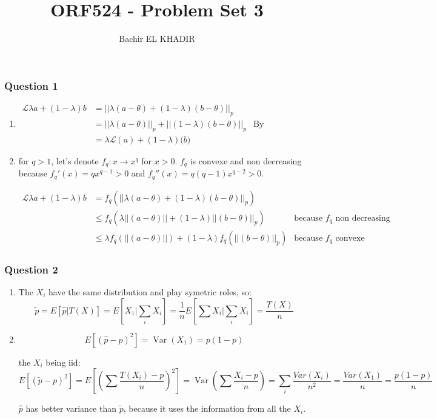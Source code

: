\documentclass[12pt]{article}
\title{ORF524 - Problem Set 3}
\author{Bachir EL KHADIR }
\newcommand{\Q}[1]{\subsubsection*{Question #1}}
\begin{document}
\maketitle

\Q{1}
\begin{enumerate}

\item

\begin{align}
\mathcal L \lambda a + (1-\lambda)b 
&= ||\lambda (a-\theta) + (1-\lambda)(b-\theta) ||_p
\\&= ||\lambda (a-\theta)||_p + ||(1-\lambda)(b-\theta) ||_p &\text{By Minkowsky}
\\&= \lambda \mathcal L(a) + (1-\lambda) \mathcal(b)
\end{align}


\item 
for $q > 1$, let's denote $f_q: x \rightarrow x^q$ for $x > 0$.
$f_q$ is convexe and non decreasing because $f_q'(x) = q x^{q-1} > 0$ and $f_q''(x) = q(q-1)x^{q-2} > 0$.

\begin{align}
\mathcal L \lambda a + (1-\lambda)b 
&= f_q(||\lambda (a-\theta) + (1-\lambda)(b-\theta) ||_p)
\\&\leq f_q(\lambda || (a-\theta)|| + (1-\lambda)||(b-\theta) ||_p)&\text{because $f_q$ non decreasing}
\\&\leq \lambda f_q( || (a-\theta)||) + (1-\lambda)f_q(||(b-\theta) ||_p) & \text{because $f_q$ convexe}
\end{align}


\end{enumerate}


\Q{2}
\begin{enumerate}
\item
The $X_i$ have the same distribution and play symetric roles, so:
$$\tilde p = E [\hat p | T(X)] = E[ X_1 | \sum_i X_i] = \frac1 n E[\sum X_i | \sum_i X_i] = \frac {T(X)} n$$

\item $$E[ (\hat p - p)^2 ] = \operatorname{Var}(X_1) = p(1-p)$$


the $X_i$ being iid:
$$E[ (\tilde p - p)^2 ] = E[ (\sum \frac{T(X_i) - p}{n})^2 ] = \operatorname{Var}(\sum \frac{X_i - p}{n}) = \sum_i \frac{Var(X_i)}{n^2} = \frac{Var(X_1)}{n} = \frac{p(1-p)}{n}$$

$\hat p$ has better variance than $\tilde p$, because it uses the information from all the $X_i$.
\end{enumerate}
\end{document}
